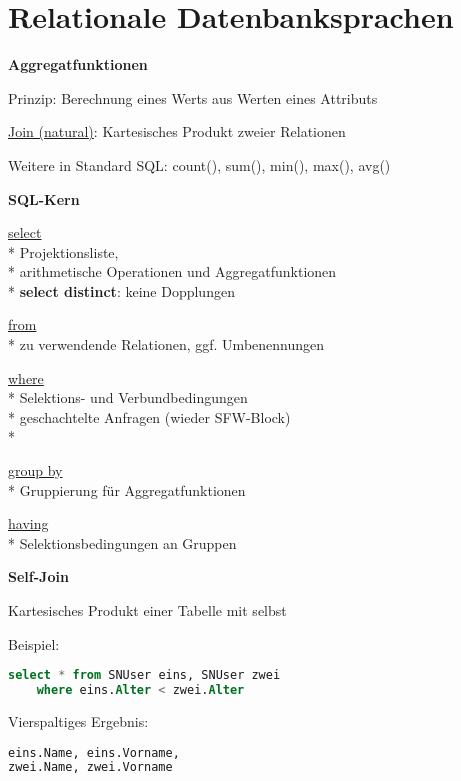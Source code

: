 \section{Relationale Datenbanksprachen}
\label{sec:sql}

\textbf{Aggregatfunktionen}
\begin{items}
	\item Prinzip: Berechnung eines Werts aus Werten eines Attributs
	\item \underline{Join (natural)}: Kartesisches Produkt zweier Relationen
	\item Weitere in Standard SQL: count(), sum(), min(), max(), avg()
\end{items}

\textbf{SQL-Kern}
\begin{items}
	\item \underline{select} \\*
		Projektionsliste, \\*
		arithmetische Operationen und Aggregatfunktionen \\*
		\textbf{select distinct}: keine Dopplungen 
	\item \underline{from} \\*
		zu verwendende Relationen, ggf. Umbenennungen
	\item \underline{where} \\*
		Selektions- und Verbundbedingungen \\*
		geschachtelte Anfragen (wieder SFW-Block) \\*
	\item \underline{group by} \\*
		Gruppierung für Aggregatfunktionen
	\item \underline{having} \\*
		Selektionsbedingungen an Gruppen
\end{items}

\textbf{Self-Join}
\begin{items}
	\item Kartesisches Produkt einer Tabelle mit selbst
	\item Beispiel:
		\begin{lstlisting}[language=sql] 
select * from SNUser eins, SNUser zwei
	where eins.Alter < zwei.Alter
		\end{lstlisting}
		Vierspaltiges Ergebnis:
		\begin{lstlisting}[language=sql]
eins.Name, eins.Vorname,
zwei.Name, zwei.Vorname
		\end{lstlisting}
\end{items}

